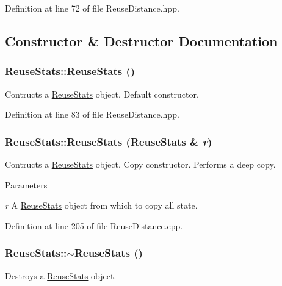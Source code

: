 Definition at line 72 of file ReuseDistance.hpp.



\subsection{Constructor \& Destructor Documentation}
\hypertarget{class_reuse_stats_a0106660db234ec0ea484c61cb18702e8}{
\subsubsection[{ReuseStats}]{\setlength{\rightskip}{0pt plus 5cm}ReuseStats::ReuseStats ()}}
\label{class_reuse_stats_a0106660db234ec0ea484c61cb18702e8}
Contructs a \hyperlink{class_reuse_stats}{ReuseStats} object. Default constructor. 

Definition at line 83 of file ReuseDistance.hpp.

\hypertarget{class_reuse_stats_a5c7df5f020e0f87e78b8f49c5624c823}{
\subsubsection[{ReuseStats}]{\setlength{\rightskip}{0pt plus 5cm}ReuseStats::ReuseStats ({\bf ReuseStats} \& {\em r})}}
\label{class_reuse_stats_a5c7df5f020e0f87e78b8f49c5624c823}
Contructs a \hyperlink{class_reuse_stats}{ReuseStats} object. Copy constructor. Performs a deep copy.


\begin{DoxyParams}{Parameters}
\item[{\em r}]A \hyperlink{class_reuse_stats}{ReuseStats} object from which to copy all state. \end{DoxyParams}


Definition at line 205 of file ReuseDistance.cpp.

\hypertarget{class_reuse_stats_a21f8a5cab3976edba08c2562c3ed8d45}{
\subsubsection[{$\sim$ReuseStats}]{\setlength{\rightskip}{0pt plus 5cm}ReuseStats::$\sim$ReuseStats ()}}
\label{class_reuse_stats_a21f8a5cab3976edba08c2562c3ed8d45}
Destroys a \hyperlink{class_reuse_stats}{ReuseStats} object. 

